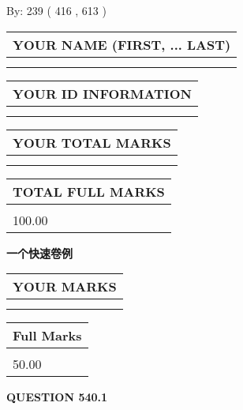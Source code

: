 \documentclass{ctexart}
\begin{document}
   
\hspace{1.0in} By: 
 239 ( 416 ,  613 )
   
   
   
   
\newpage 
\setcounter{page}{ 
   540001 } 
   
   
   
   
\noindent\begin{tabular}{|l|}
\hline
YOUR NAME (FIRST, ... LAST)  \\
\hline
 \\ 
 \\ 
\hline
\end{tabular}
\hspace{0.05in} \begin{tabular}{|l|}
\hline
 YOUR   ID   INFORMATION  \\
\hline
 \\ 
 \\ 
\hline
\end{tabular}
   
   
\vspace{0.2in}\noindent\begin{tabular}{|l|}
\hline
YOUR TOTAL MARKS  \\
\hline
 \\ 
 \\ 
\hline
\end{tabular}
\hspace{0.05in} \begin{tabular}{|l|}
\hline
TOTAL FULL MARKS  \\
\hline
 \\ 
100.00 \\
\hline
\end{tabular}
   
   
 \vspace{0.2in}
{\LARGE {\textbf{ 一个快速卷例}}}
   
   
  
\vspace{0.2in}
  
\noindent\begin{tabular}{|l|}
\hline
 YOUR MARKS  \\
\hline
 \\ 
 \\ 
\hline
\end{tabular}
\hspace{0.05in} \begin{tabular}{|l|}
\hline
 Full Marks  \\
\hline
 \\ 
50.00 \\
\hline
\end{tabular}
{\textbf{\Large{QUESTION
540.1 
}}}
  
\end{document}
